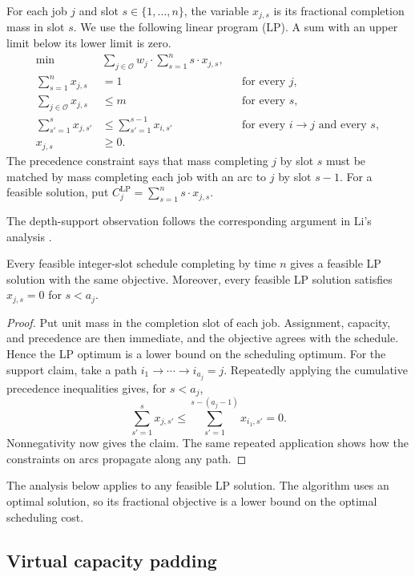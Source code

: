 For each job $j$ and slot $s\in\{1,\ldots,n\}$, the variable
$x_{j,s}$ is its fractional completion mass in slot $s$. We use the
following linear program (LP). A sum with an upper limit below its lower
limit is zero.
\begin{align*}
 \min\quad &\sum_{j\in\mathcal O}w_j\cdot\sum_{s=1}^n s\cdot x_{j,s},\\
 \sum_{s=1}^n x_{j,s}&=1 &&\text{for every }j,\\
 \sum_{j\in\mathcal O} x_{j,s}&\le m &&\text{for every }s,\\
 \sum_{s'=1}^{s}x_{j,s'}&\le\sum_{s'=1}^{s-1}x_{i,s'}
       &&\text{for every }i\to j\text{ and every }s,\\
 x_{j,s}&\ge0.
\end{align*}
The precedence constraint says that mass completing $j$ by slot $s$ must
be matched by mass completing each job with an arc to $j$ by slot $s-1$. For a
feasible solution, put $C_j^{\mathrm{LP}}=\sum_{s=1}^n s\cdot x_{j,s}$.

The depth-support observation follows the corresponding argument in
Li's analysis \cite[Claim~3.1]{Li2017}.

\begin{lemma}
\label{lem:lp-support}
Every feasible integer-slot schedule completing by time $n$ gives a feasible
LP solution with the same objective. Moreover, every feasible LP solution satisfies
$x_{j,s}=0$ for $s<a_j$.
\end{lemma}
\begin{proof}
Put unit mass in the completion slot of each job. Assignment, capacity,
and precedence are then immediate, and the objective agrees with the
schedule. Hence the LP optimum is a lower bound on the scheduling optimum.
For the support claim, take a path $i_1\to\cdots\to i_{a_j}=j$. Repeatedly
applying the cumulative precedence inequalities gives, for $s<a_j$,
\[
 \sum_{s'=1}^{s}x_{j,s'}
 \le \sum_{s'=1}^{s-(a_j-1)}x_{i_1,s'}=0.
\]
Nonnegativity now gives the claim. The same repeated application shows how the constraints on
arcs propagate along any path.
\end{proof}

The analysis below applies to any feasible LP solution. The algorithm uses
an optimal solution, so its fractional objective is a lower bound on the
optimal scheduling cost.

\subsection{Virtual capacity padding}
\label{sec:foundations-padding}

